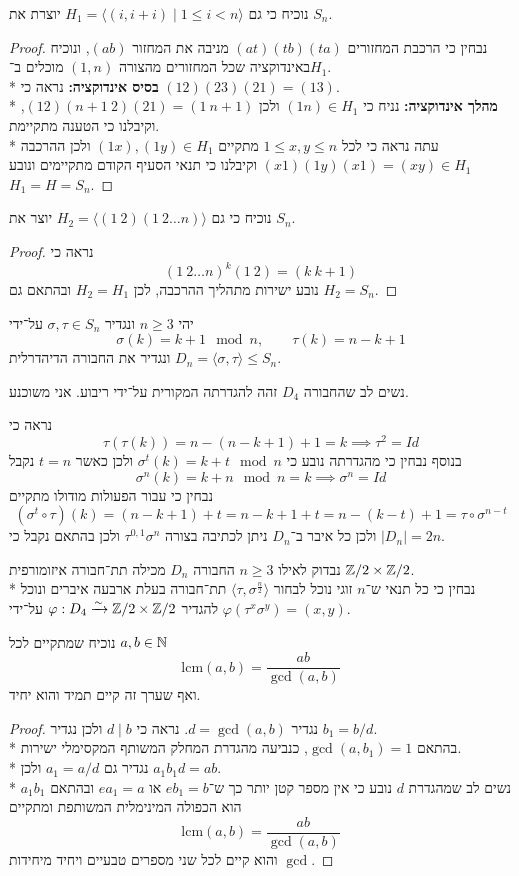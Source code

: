 \Subquestion{}
נוכיח כי גם $H_1 = \langle (i, i + i) \mid 1 \le i < n \rangle$ יוצרת את $S_n$.
\begin{proof}
	נבחין כי הרכבת המחזורים $(a t)(t b)(ta)$ מניבה את המחזור $(a b)$, ונוכיח באינדוקציה שכל המחזורים מהצורה $(1, n)$ מוכלים ב־$H_1$. \\*
	\textbf{בסיס אינדוקציה:} נראה כי $(1 2)(2 3)(2 1) = (1 3)$. \\*
	\textbf{מהלך אינדוקציה:} נניח כי $(1 n) \in H_1$ ולכן $(1 2)(n+1\ 2)(2 1) = (1\ n + 1)$, וקיבלנו כי הטענה מתקיימת. \\*
	עתה נראה כי לכל $1 \le x, y \le n$ מתקיים $(1 x), (1 y) \in H_1$ ולכן ההרכבה $(x 1)(1 y)(x 1) = (x y) \in H_1$ וקיבלנו כי תנאי הסעיף הקודם מתקיימים ונובע $H_1 = H = S_n$.
\end{proof}

\Subquestion{}
נוכיח כי גם $H_2 = \langle (1\ 2)(1\ 2 \hdots n) \rangle$ יוצר את $S_n$.
\begin{proof}
	נראה כי
	\[
		{(1\ 2 \hdots n)}^k
		(1\ 2)
		= (k\ k+1)
	\]
	נובע ישירות מתהליך ההרכבה, לכן $H_2 = H_1$ ובהתאם גם $H_2 = S_n$.
\end{proof}

\Question{}
יהי $n \ge 3$ ונגדיר $\sigma, \tau \in S_n$ על־ידי
\[
	\sigma(k) = k + 1 \mod n, \qquad \tau(k) = n - k + 1
\]
ונגדיר את החבורה הדיהדרלית $D_n = \langle\sigma, \tau\rangle \le S_n$.

\Subquestion{}
נשים לב שהחבורה $D_4$ זהה להגדרתה המקורית על־ידי ריבוע. אני משוכנע.

\Subquestion{}
נראה כי
\[
	\tau(\tau(k)) = n - (n - k + 1) + 1 = k \implies \tau^2 = Id
\]
בנוסף נבחין כי מהגדרתה נובע כי $\sigma^t(k) = k + t \mod n$ ולכן כאשר $t = n$ נקבל
\[
	\sigma^n(k) = k + n \mod n = k \implies \sigma^n = Id
\]
נבחין כי עבור הפעולות מודולו מתקיים
\[
	(\sigma^t \circ \tau)(k)
	= (n - k + 1) + t
	= n - k + 1 + t
	= n - (k - t) + 1
	= \tau \circ \sigma^{n - t}
\]
ולכן כל איבר ב־$D_n$ ניתן לכתיבה בצורה $\tau^{0, 1} \sigma^n$ ולכן בהתאם נקבל כי $|D_n| = 2n$.

\Subquestion{}
נבדוק לאילו $n \ge 3$ החבורה $D_n$ מכילה תת־חבורה איזומורפית $\mathbb{Z}/2 \times \mathbb{Z}/2$. \\*
נבחין כי כל תנאי ש־$n$ זוגי נוכל לבחור $\langle \tau, \sigma^{\frac{n}{2}} \rangle$ תת־חבורה בעלת ארבעה איברים ונוכל להגדיר $\varphi : D_4 \xrightarrow{\sim} \mathbb{Z}/2 \times \mathbb{Z}/2$ על־ידי $\varphi(\tau^x \sigma^y) = (x, y)$.

\Question{}
\Subquestion{}
נוכיח שמתקיים לכל $a, b \in \mathbb{N}$
\[
	\text{lcm}(a, b) = \frac{ab}{\gcd(a, b)}
\]
ואף שערך זה קיים תמיד והוא יחיד.
\begin{proof}
	נגדיר $d = \gcd(a, b)$. נראה כי $d \mid b$ ולכן נגדיר $b_1 = b/d$. \\*
	בהתאם $\gcd(a, b_1) = 1$, כנביעה מהגדרת המחלק המשותף המקסימלי ישירות. \\*
	נגדיר גם $a_1 = a / d$ ולכן $a_1 b_1 d = ab$. \\*
	נשים לב שמהגדרת $d$ נובע כי אין מספר קטן יותר כך ש־$e b_1 = b$ או $e a_1 = a$ ובהתאם $a_1 b_1$ הוא הכפולה המינימלית המשותפת ומתקיים
	\[
		\text{lcm}(a, b) = \frac{ab}{\gcd(a, b)}
	\]
	והוא קיים לכל שני מספרים טבעיים ויחיד מיחידות $\gcd$.
\end{proof}

